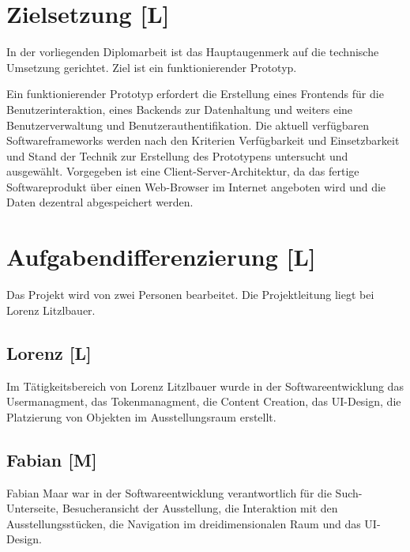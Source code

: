 \section{Zielsetzung [L]}
In der vorliegenden Diplomarbeit ist das Hauptaugenmerk auf die technische Umsetzung gerichtet. Ziel ist ein funktionierender Prototyp.

Ein funktionierender Prototyp erfordert die Erstellung eines Frontends für die Benutzerinteraktion, eines Backends zur Datenhaltung und weiters eine Benutzerverwaltung und Benutzerauthentifikation. Die aktuell verfügbaren Softwareframeworks werden nach den Kriterien Verfügbarkeit und Einsetzbarkeit und Stand der Technik zur Erstellung des Prototypens untersucht und ausgewählt. Vorgegeben ist eine Client-Server-Architektur, da das fertige Softwareprodukt über einen Web-Browser im Internet angeboten wird und die Daten dezentral abgespeichert werden.

\section{Aufgabendifferenzierung [L]}
Das Projekt wird von zwei Personen bearbeitet. Die Projektleitung liegt bei Lorenz Litzlbauer. 

\subsection{Lorenz [L]}
Im Tätigkeitsbereich von Lorenz Litzlbauer wurde in der Softwareentwicklung das 
Usermanagment, 
das Tokenmanagment,
die Content Creation,
das UI-Design, 
die Platzierung von Objekten im Ausstellungsraum erstellt.

\subsection{Fabian [M]}
 Fabian Maar war in der Softwareentwicklung verantwortlich für die Such-Unterseite, Besucheransicht der Ausstellung, die Interaktion mit den Ausstellungsstücken, die Navigation im dreidimensionalen Raum und das UI-Design.
	
